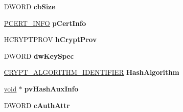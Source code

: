 \begin{DoxyCompactItemize}
\item 
\mbox{\label{struct___c_m_s_g___s_i_g_n_e_r___e_n_c_o_d_e___i_n_f_o___w_i_t_h___c_m_s_a4a0bdcbccdb5513ae433802d370fb4d7}} 
D\+W\+O\+RD {\bfseries cb\+Size}
\item 
\mbox{\label{struct___c_m_s_g___s_i_g_n_e_r___e_n_c_o_d_e___i_n_f_o___w_i_t_h___c_m_s_a129b362dfa18ba9f080a48713f64edfb}} 
\hyperlink{struct___c_e_r_t___i_n_f_o}{P\+C\+E\+R\+T\+\_\+\+I\+N\+FO} {\bfseries p\+Cert\+Info}
\item 
\mbox{\label{struct___c_m_s_g___s_i_g_n_e_r___e_n_c_o_d_e___i_n_f_o___w_i_t_h___c_m_s_a7b3bb612b6eddc2967458754c59a084d}} 
H\+C\+R\+Y\+P\+T\+P\+R\+OV {\bfseries h\+Crypt\+Prov}
\item 
\mbox{\label{struct___c_m_s_g___s_i_g_n_e_r___e_n_c_o_d_e___i_n_f_o___w_i_t_h___c_m_s_ad52619675fa73955e5d780f4f1ef09c6}} 
D\+W\+O\+RD {\bfseries dw\+Key\+Spec}
\item 
\mbox{\label{struct___c_m_s_g___s_i_g_n_e_r___e_n_c_o_d_e___i_n_f_o___w_i_t_h___c_m_s_a36a9f2ceae16d46be30e0535274d0fd9}} 
\hyperlink{struct___c_r_y_p_t___a_l_g_o_r_i_t_h_m___i_d_e_n_t_i_f_i_e_r}{C\+R\+Y\+P\+T\+\_\+\+A\+L\+G\+O\+R\+I\+T\+H\+M\+\_\+\+I\+D\+E\+N\+T\+I\+F\+I\+ER} {\bfseries Hash\+Algorithm}
\item 
\mbox{\label{struct___c_m_s_g___s_i_g_n_e_r___e_n_c_o_d_e___i_n_f_o___w_i_t_h___c_m_s_a71ed6e9d1265dadfcbcd3ae228767838}} 
\hyperlink{interfacevoid}{void} $\ast$ {\bfseries pv\+Hash\+Aux\+Info}
\item 
\mbox{\label{struct___c_m_s_g___s_i_g_n_e_r___e_n_c_o_d_e___i_n_f_o___w_i_t_h___c_m_s_a6da738a4286be57d168cedd9071f1e4d}} 
D\+W\+O\+RD {\bfseries c\+Auth\+Attr}

\end{DoxyCompactItemize}
